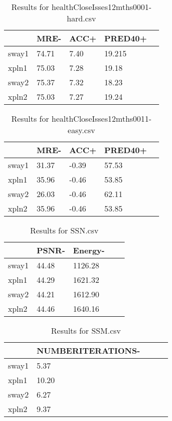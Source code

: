 \begin{table}[]
  \begin{center}
    \begin{tabular}{lllll}
          & MRE- & ACC+ & PRED40+   \\
    \hline
    sway1 & 74.71 & 7.40 & 19.215  \\
    xpln1 & 75.03 & 7.28 & 19.18     \\
    sway2 & 75.37 & 7.32 & 18.23     \\
    xpln2 & 75.03 & 7.27 & 19.24         
    \end{tabular}
  \end{center}
  \caption{Results for healthCloseIsses12mths0001-hard.csv}
  \label{tab:health-hard}
\end{table}

\begin{table}[]
  \begin{center}
    \begin{tabular}{lllll}
          & MRE- & ACC+ & PRED40+   \\
    \hline
    sway1 & 31.37 & -0.39 & 57.53   \\
    xpln1 & 35.96 & -0.46 & 53.85     \\
    sway2 & 26.03 & -0.46 & 62.11      \\
    xpln2 & 35.96 & -0.46 & 53.85          
    \end{tabular}
  \end{center}
  \caption{Results for healthCloseIsses12mths0011-easy.csv}
  \label{tab:health-easy}
\end{table}

\begin{table}[]
  \begin{center}
    \begin{tabular}{lllll}
          & PSNR-  &   Energy-    \\
    \hline
    sway1 & 44.48  &   1126.28   \\
    xpln1 & 44.29  &   1621.32     \\
    sway2 & 44.21  &   1612.90      \\
    xpln2 & 44.46  &   1640.16          
    \end{tabular}
  \end{center}
  \caption{Results for SSN.csv}
  \label{tab:ssn}
\end{table}


\begin{table}[]
  \begin{center}
    \begin{tabular}{lllll}
          & NUMBERITERATIONS-    \\
    \hline
    sway1 & 5.37   \\
    xpln1 & 10.20     \\
    sway2 & 6.27      \\
    xpln2 & 9.37         
    \end{tabular}
  \end{center}
  \caption{Results for SSM.csv}
  \label{tab:ssm}
\end{table}

